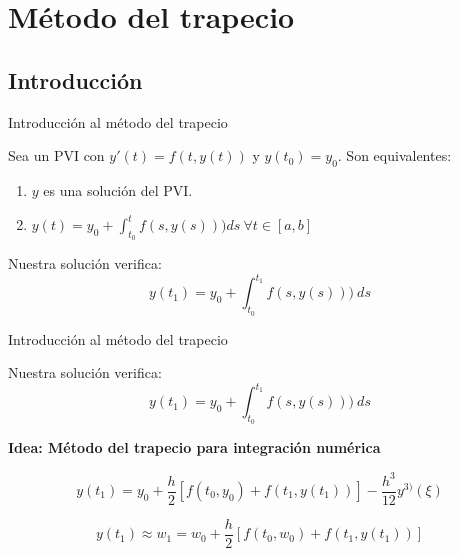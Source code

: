 \section{Método del trapecio}

	\subsection{Introducción}

		\begin{frame}{Introducción al método del trapecio}
			\fontsize{11}{11}\selectfont				
			\begin{proposition} \label{prop:sol-eq}
				Sea un PVI con $y'(t) = f(t,y(t))$ y $y(t_0) = y_0$.  Son equivalentes:
				\begin{enumerate}
					\item $y$ es una solución del PVI.
					\item $y(t) = y_0 + \int_{t_0}^{t} f(s,y(s))) ds \ \forall t \in [a,b]$
				\end{enumerate}
			\end{proposition}

			\kern 7mm
			\begin{tcolorbox}[colback=ChetwodeBlue!10,colframe=ChetwodeBlue!60]
				Nuestra solución verifica:
				\begin{equation*}
					y(t_1)  = y_0 + \int_{t_0}^{t_1} f(s,y(s))) \ ds
				\end{equation*}		
			\end{tcolorbox}
		\end{frame}

		\begin{frame}{Introducción al método del trapecio}
			\fontsize{10}{10}\selectfont				
			\begin{tcolorbox}[colback=ChetwodeBlue!10,colframe=ChetwodeBlue!60]
				Nuestra solución verifica:
				\begin{equation*}
				y(t_1)  = y_0 + \int_{t_0}^{t_1} f(s,y(s))) \ ds
				\end{equation*}		
			\end{tcolorbox}

			\begin{tcolorbox}[colback=ChetwodeBlue!10,colframe=ChetwodeBlue!60]
				\centering
				\textbf{Idea: Método del trapecio para integración numérica}
				\begin{itemize}
					\begin{equation} \label{eq:trapecio-igualdad}
						y(t_{1}) = y_0 + \frac{h}{2} \left[f(t_0,y_0) + f(t_1, y(t_1))\right] - \frac{h^3}{12}y^{3)}(\xi)
					\end{equation}
	
					\begin{equation} \label{eq:app}
						y(t_1) \approx w_1 = w_0 + \frac{h}{2} \left[f(t_0,w_0) + f(t_1, y(t_1))\right]
					\end{equation}			
				\end{itemize}

			\end{tcolorbox}
			
		\end{frame}


